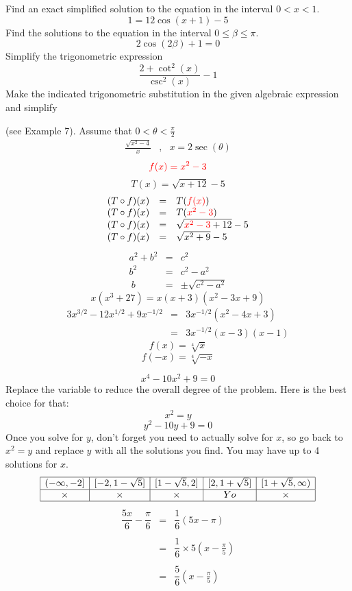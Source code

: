 \documentclass[addpoints, 24pt] {exam}
\begin{document}
Find an exact simplified solution to the equation in the interval \(0<x<1\).
\[
1 = 12\cos(x+1)-5
\]
\newpage
Find the solutions to the equation in the interval \(0\leq \beta \leq \pi\).
\[
2\cos(2\beta)+1=0
\]
\newpage
Simplify the trigonometric expression
\[
\displaystyle \frac{2+\cot^2(x)}{\csc^2(x)}-1
\]\newpage
Make the indicated trigonometric substitution in the given algebraic expression and simplify 

(see Example 7). Assume that \(0<\theta<	\frac{\pi}{2}\)
\[
\begin{array}{rcr}
\displaystyle \frac{\sqrt{x^2-4}}{x}&,&x=2\sec(\theta)
\end{array}
\]
\newpage
\[
\color{red}
f(x) = x^2-3
\]
\[
T(x) = \sqrt{x+12} -5
\]
\[\begin{array}{rcl}
(T\circ f)(x) &=& T({\color{red}f(x)})\\
(T\circ f)(x) &=&T({\color{red}x^2-3})\\
(T\circ f)(x) &=&\sqrt{{\color{red}x^2-3}+12}-5\\
(T\circ f)(x) &=&\sqrt{x^2+9}-5
\end{array}
\]
\newpage
\[
\begin{array}{rcl}
a^2+b^2 &=& c^2\\
b^2 &=&c^2-a^2\\\
b&=&\pm\sqrt{c^2-a^2}
\end{array}
\]
\[
x(x^3+27)=x(x+3)(x^2-3x+9)
\]
\newpage
\[
\begin{array}{rcl}
3x^{3/2}-12x^{1/2}+9x^{-1/2}&=&3x^{-1/2}\left(x^2-4x+3\right)\\
&=&3x^{-1/2}(x-3)(x-1)
\end{array}
\]
\[
f(x) =\sqrt[4]{x}
\]
\[
f(-x) = \sqrt[4]{-x}
\]

\[
x^4 - 10x^2 +9 = 0
\]
Replace the variable to reduce the overall degree of the problem. Here is the best choice for that:
\[x^2 = y\]
\[
y^2-10y+9 = 0\]
Once you solve for \(y\), don't forget you need to actually solve for \(x\), so go back to \(x^2=y\) and replace \(y\) with all the solutions you find. You may have up to 4 solutions for \(x\).
\[
	\begin{array}{|c|c|c|c|c|}
		\hline
		(-\infty,-2] & [-2,1-\sqrt{5}] & [1-\sqrt{5},2] & [2,1+\sqrt{5}] & [1+\sqrt{5},\infty) \\\hline
		\times & \times & \times & Yo & \times \\\hline
	\end{array}
\]
\newline
\large
$$\begin{array}{rcl}
\dfrac{5x}{6}-\dfrac{\pi}{6}&=&\dfrac{1}{6}\left(5x-\pi\right)\\\\
&=&\dfrac{1}{6}\times 5\left(x-\frac{\pi}{5}\right)\\\\
&=&\dfrac{5}{6}\left(x-\frac{\pi}{5}\right)
\end{array}$$
\end{document}
